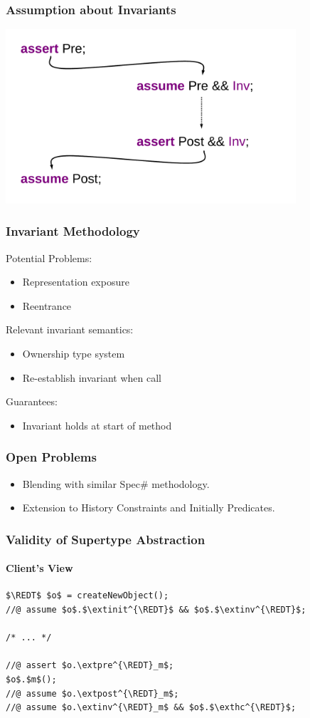 \begin{frame}
\frametitle{Assumption about Invariants}
\transwipe[direction=270]
\includegraphics[width=4.25in]{invariant-call2}
\end{frame}

\begin{frame}
\frametitle{Invariant Methodology}
Potential Problems:
\begin{itemize}
\item
Representation exposure

\item
Reentrance
\end{itemize}

Relevant invariant semantics:
\begin{itemize}
\item
Ownership type system

\item
Re-establish invariant when call
\end{itemize}

Guarantees:
\begin{itemize}
\item
Invariant holds at start of method
\end{itemize}
\end{frame}

\begin{frame}
\frametitle{Open Problems}
\begin{itemize}
\item
Blending with similar Spec\# methodology.

\item
Extension to History Constraints and Initially Predicates.
\end{itemize}
\end{frame}

\begin{frame}[fragile,label=validity]
\frametitle{Validity of Supertype Abstraction}
\framesubtitle{Client's View}

\begin{lstlisting}[mathescape=true]
$\REDT$ $o$ = createNewObject();
//@ assume $o$.$\extinit^{\REDT}$ && $o$.$\extinv^{\REDT}$;

/* ... */

//@ assert $o.\extpre^{\REDT}_m$;
$o$.$m$();
//@ assume $o.\extpost^{\REDT}_m$;
//@ assume $o.\extinv^{\REDT}_m$ && $o$.$\exthc^{\REDT}$;
\end{lstlisting}
\end{frame}

